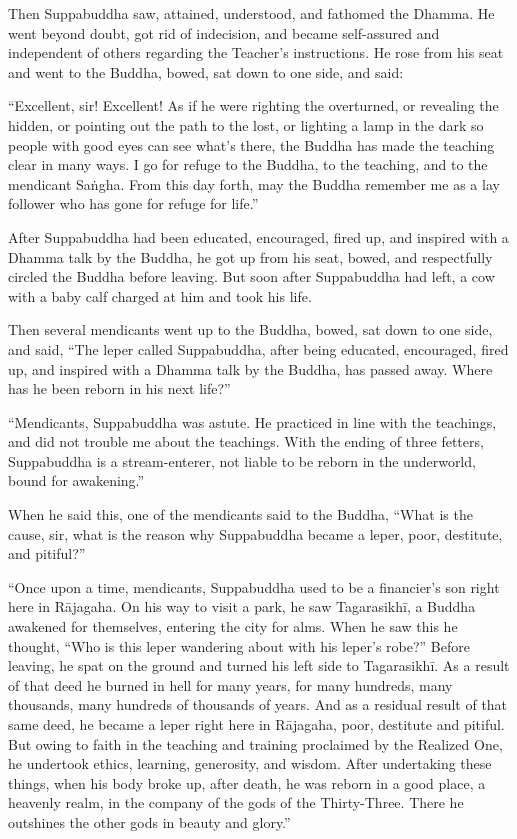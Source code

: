 \documentclass[12pt,openany]{book}%
\begin{document}
Then Suppabuddha saw, attained, understood, and fathomed the Dhamma. He went beyond doubt, got rid of indecision, and became self-assured and independent of others regarding the Teacher’s instructions. He rose from his seat and went to the Buddha, bowed, sat down to one side, and said: 

“Excellent, sir! Excellent! As if he were righting the overturned, or revealing the hidden, or pointing out the path to the lost, or lighting a lamp in the dark so people with good eyes can see what’s there, the Buddha has made the teaching clear in many ways. I go for refuge to the Buddha, to the teaching, and to the mendicant \textsanskrit{Saṅgha}. From this day forth, may the Buddha remember me as a lay follower who has gone for refuge for life.” 

After Suppabuddha had been educated, encouraged, fired up, and inspired with a Dhamma talk by the Buddha, he got up from his seat, bowed, and respectfully circled the Buddha before leaving. But soon after Suppabuddha had left, a cow with a baby calf charged at him and took his life. 

Then several mendicants went up to the Buddha, bowed, sat down to one side, and said, “The leper called Suppabuddha, after being educated, encouraged, fired up, and inspired with a Dhamma talk by the Buddha, has passed away. Where has he been reborn in his next life?” 

“Mendicants, Suppabuddha was astute. He practiced in line with the teachings, and did not trouble me about the teachings. With the ending of three fetters, Suppabuddha is a stream-enterer, not liable to be reborn in the underworld, bound for awakening.” 

When he said this, one of the mendicants said to the Buddha, “What is the cause, sir, what is the reason why Suppabuddha became a leper, poor, destitute, and pitiful?” 

“Once upon a time, mendicants, Suppabuddha used to be a financier’s son right here in \textsanskrit{Rājagaha}. On his way to visit a park, he saw \textsanskrit{Tagarasikhī}, a Buddha awakened for themselves, entering the city for alms. When he saw this he thought, “Who is this leper wandering about with his leper’s robe?” Before leaving, he spat on the ground and turned his left side to \textsanskrit{Tagarasikhī}. As a result of that deed he burned in hell for many years, for many hundreds, many thousands, many hundreds of thousands of years. And as a residual result of that same deed, he became a leper right here in \textsanskrit{Rājagaha}, poor, destitute and pitiful. But owing to faith in the teaching and training proclaimed by the Realized One, he undertook ethics, learning, generosity, and wisdom. After undertaking these things, when his body broke up, after death, he was reborn in a good place, a heavenly realm, in the company of the gods of the Thirty-Three. There he outshines the other gods in beauty and glory.” 
\end{document}
